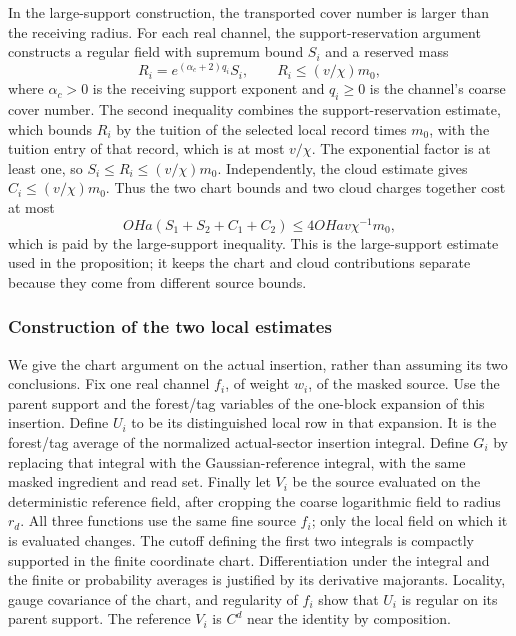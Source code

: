 In the large-support construction, the transported cover number is larger
than the receiving radius. For each real channel, the support-reservation
argument constructs a regular field with supremum bound \(S_i\) and a
reserved mass
\[
 R_i=e^{(\alpha_c+2)q_i}S_i,
 \qquad R_i\leq(v/\chi)m_0,
\]
where \(\alpha_c>0\) is the receiving support exponent and \(q_i\geq0\)
is the channel's coarse cover number. The second inequality combines the
support-reservation estimate, which bounds \(R_i\) by the tuition of the
selected local record times \(m_0\), with the tuition entry of that
record, which is at most \(v/\chi\). The exponential factor is at least
one, so \(S_i\leq R_i\leq(v/\chi)m_0\). Independently, the cloud estimate
gives \(C_i\leq(v/\chi)m_0\). Thus the two chart bounds and two cloud
charges together cost at most
\[
 OHa(S_1+S_2+C_1+C_2)
       \leq 4OHav\chi^{-1}m_0,
\]
which is paid by the large-support inequality. This is the large-support
estimate used in the proposition; it keeps the chart and cloud contributions
separate because they come from different source bounds.

\subsubsection{Construction of the two local estimates}
\label{subsec:trace-regular-chart-construction}

We give the chart argument on the actual insertion, rather than assuming
its two conclusions. Fix one real channel $f_i$, of weight $w_i$, of the
masked source. Use the parent support and the forest/tag variables of the
one-block expansion of this insertion. Define $U_i$ to be its distinguished
local row in that expansion. It is the forest/tag average of the normalized
actual-sector insertion integral. Define $G_i$ by replacing that integral
with the Gaussian-reference integral, with the same masked ingredient and
read set. Finally let $V_i$ be the source evaluated on the deterministic
reference field, after cropping the coarse logarithmic field to radius
$r_d$. All three functions use the same fine source $f_i$; only the local
field on which it is evaluated changes. The cutoff defining the first two
integrals is compactly supported in the finite coordinate chart.
Differentiation under the integral and the finite or probability averages
is justified by its derivative majorants. Locality, gauge covariance of the
chart, and regularity of $f_i$ show that $U_i$ is regular on its parent
support. The reference $V_i$ is $C^d$ near the identity by composition.


